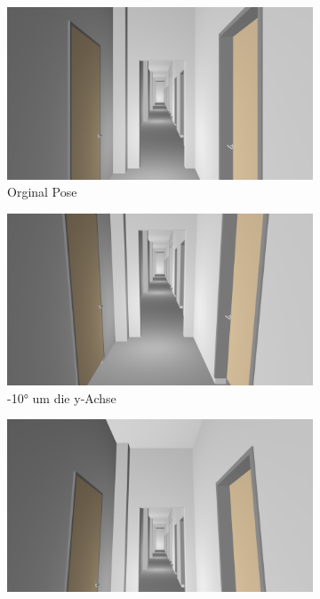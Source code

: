 \begin{figure}
	\centering
	\begin{subfigure}[t]{0.18\linewidth}
		\centering
		\includegraphics[width=\linewidth]{images/syn_dataset/00023.png}
		\caption{Orginal Pose \vspace{\fill}}
		\label{subfig:iz0_y0}
	\end{subfigure}
	\hfill 
	\begin{subfigure}[t]{0.18\linewidth}
		\centering
		\includegraphics[width=\linewidth]{images/syn_dataset/00021.png}
		\caption{-10° um die y-Achse}
		\label{subfig:iz0_y-10}
	\end{subfigure}
	\hfill
	\begin{subfigure}[t]{0.18\linewidth}
		\centering
		\includegraphics[width=\linewidth]{images/syn_dataset/00020.png}

\end{subfigure}
\end{figure}
